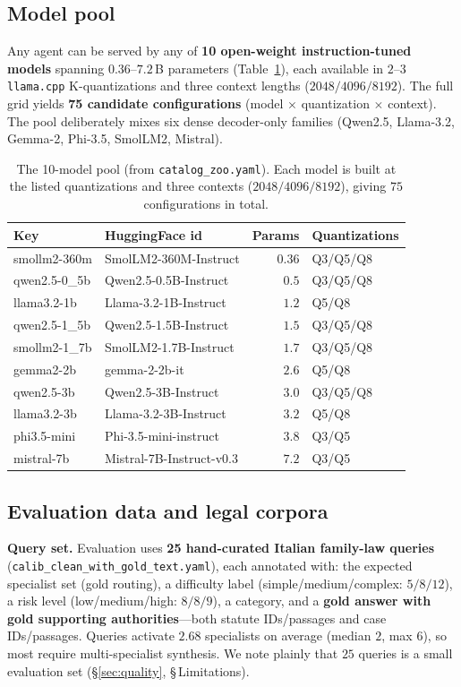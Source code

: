 \documentclass[11pt]{article}
\begin{document}
\subsection{Model pool}
Any agent can be served by any of \textbf{10 open-weight instruction-tuned models}
spanning $0.36$--$7.2$\,B parameters (Table~\ref{tab:models}), each available in
$2$--$3$ \texttt{llama.cpp} K-quantizations and three context lengths
($2048/4096/8192$). The full grid yields \textbf{75 candidate configurations}
(model $\times$ quantization $\times$ context). The pool deliberately mixes six
dense decoder-only families (Qwen2.5, Llama-3.2, Gemma-2, Phi-3.5, SmolLM2,
Mistral).

\begin{table}[H]
\centering
\caption{The 10-model pool (from \texttt{catalog\_zoo.yaml}). Each model is built
at the listed quantizations and three contexts ($2048/4096/8192$), giving $75$
configurations in total.}
\label{tab:models}
\small
\begin{tabular}{@{}llr l@{}}
\toprule
Key & HuggingFace id & Params & Quantizations \\
\midrule
smollm2-360m & SmolLM2-360M-Instruct & $0.36$ & Q3/Q5/Q8 \\
qwen2.5-0\_5b & Qwen2.5-0.5B-Instruct & $0.5$ & Q3/Q5/Q8 \\
llama3.2-1b & Llama-3.2-1B-Instruct & $1.2$ & Q5/Q8 \\
qwen2.5-1\_5b & Qwen2.5-1.5B-Instruct & $1.5$ & Q3/Q5/Q8 \\
smollm2-1\_7b & SmolLM2-1.7B-Instruct & $1.7$ & Q3/Q5/Q8 \\
gemma2-2b & gemma-2-2b-it & $2.6$ & Q5/Q8 \\
qwen2.5-3b & Qwen2.5-3B-Instruct & $3.0$ & Q3/Q5/Q8 \\
llama3.2-3b & Llama-3.2-3B-Instruct & $3.2$ & Q5/Q8 \\
phi3.5-mini & Phi-3.5-mini-instruct & $3.8$ & Q3/Q5 \\
mistral-7b & Mistral-7B-Instruct-v0.3 & $7.2$ & Q3/Q5 \\
\bottomrule
\end{tabular}
\end{table}

\subsection{Evaluation data and legal corpora}
\textbf{Query set.} Evaluation uses \textbf{25 hand-curated Italian family-law
queries} (\texttt{calib\_clean\_with\_gold\_text.yaml}), each annotated with: the
expected specialist set (gold routing), a difficulty label
(simple/medium/complex: $5/8/12$), a risk level (low/medium/high: $8/8/9$), a
category, and a \textbf{gold answer with gold supporting authorities}---both
statute IDs/passages and case IDs/passages. Queries activate $2.68$ specialists
on average (median $2$, max $6$), so most require multi-specialist synthesis. We
note plainly that $25$ queries is a small evaluation set
(§\ref{sec:quality}, §\,Limitations).
\end{document}
